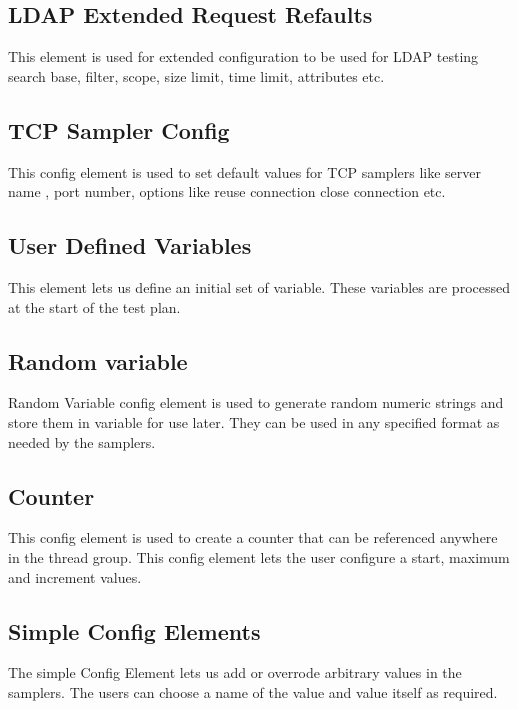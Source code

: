 \documentclass[12pt]{book}
\begin{document}
 \subsection{LDAP Extended Request Refaults}
 This element is used for extended configuration to be used for LDAP testing search base, filter, scope, size limit, time limit, attributes etc.
 
 \subsection{TCP Sampler Config}
 This config element is used to set default values for TCP samplers like server name , port number, options like reuse connection close connection etc.
 
 \subsection{User Defined Variables}
 This element lets us define an initial set of variable. These variables are processed at the start of the test plan.
 
 \subsection{Random variable}
 Random Variable config element is used to generate random numeric strings and store them in variable for use later. They can be used in any specified format
as needed by the samplers.

 \subsection{Counter}
 This config element is used to create a counter that can be referenced anywhere in the thread group.
 This config element lets the user configure a start, maximum and increment values.
 
 \subsection{Simple Config Elements}
 The simple Config Element lets us add or overrode arbitrary values in the samplers. The users can choose a name of the value and value itself as required.
 
\end{document}

